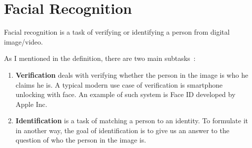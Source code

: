 \chapter{Facial Recognition}\label{ch:face-rec}
Facial recognition is a task of verifying or identifying a person from digital image/video.

As I mentioned in the definition, there are two main subtasks~\cite{FaceRec}:
\begin{enumerate}
    \item \textbf{Verification} deals with verifying whether the person in the image is who he claims he is.
    A typical modern use case of verification is smartphone unlocking with face.
    An example of such system is Face ID developed by Apple Inc.

    \item \textbf{Identification} is a task of matching a person to an identity.
    To formulate it in another way, the goal of identification is to give us an answer to the question of who the person
    in the image is.
\end{enumerate}

